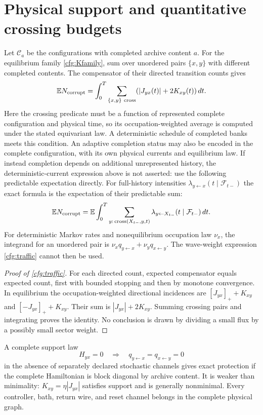 \documentclass[11pt,oneside,openany]{book}
\theoremstyle{definition}
\theoremstyle{remark}\newtheorem{remark}[theorem]{Remark}
\begin{document}
\section{Physical support and quantitative crossing budgets}

Let $\mathcal C_a$ be the configurations with completed archive content $a$.
For the equilibrium family \eqref{cfg:Kfamily}, sum over unordered pairs
$\{x,y\}$ with different completed contents. The compensator of their
directed transition counts gives
\begin{equation}
 \mathbb E N_{\rm corrupt}
 =\int_0^T\sum_{\{x,y\}\ {\rm cross}}
             (|J_{yx}(t)|+2K_{xy}(t))\,dt.
 \label{cfg:traffic}
\end{equation}
Here the crossing predicate must be a function of represented complete
configuration and physical time, so its occupation-weighted average is
computed under the stated equivariant law. A deterministic schedule of
completed banks meets this condition. An adaptive completion status may
also be encoded in the complete configuration, with its own physical
currents and equilibrium law. If instead completion depends on additional
unrepresented history, the deterministic-current expression above is not
asserted: use the following predictable expectation directly. For full-history
intensities $\lambda_{y\leftarrow x}(t\mid\mathcal F_{t-})$ the exact
formula is the expectation of their predictable sum:
\[
 \mathbb E N_{\rm corrupt}
 =\mathbb E\int_0^T\sum_{y:\,{\rm cross}(X_{t-},y,t)}
            \lambda_{y\leftarrow X_{t-}}(t\mid\mathcal F_{t-})\,dt.
\]
For deterministic Markov rates and nonequilibrium occupation law $\nu_x$,
the integrand for an unordered pair is
$\nu_xq_{y\leftarrow x}+\nu_yq_{x\leftarrow y}$.
The wave-weight expression \eqref{cfg:traffic} cannot then be used.

\begin{proof}[Proof of \eqref{cfg:traffic}]
For each directed count, expected compensator equals expected count,
first with bounded stopping and then by monotone convergence.
In equilibrium the occupation-weighted directional incidences are
$[J_{yx}]_++K_{xy}$ and $[-J_{yx}]_++K_{xy}$.
Their sum is $|J_{yx}|+2K_{xy}$. Summing crossing pairs and integrating
proves the identity. No conclusion is drawn by dividing a small flux by
a possibly small sector weight.
\end{proof}

A complete support law
\begin{equation}
 H_{yx}=0\quad\Longrightarrow\quad
 q_{y\leftarrow x}=q_{x\leftarrow y}=0
 \label{cfg:support}
\end{equation}
in the absence of separately declared stochastic channels gives exact
protection if the complete Hamiltonian is block diagonal by archive content.
It is weaker than minimality: $K_{xy}=\eta|J_{yx}|$ satisfies support and
is generally nonminimal. Every controller, bath, return wire, and reset
channel belongs in the complete physical graph.
\end{document}

